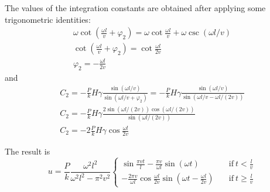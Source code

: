 \begin{Answer}[ref={moving_load}]
The values of the integration constants are obtained after applying some trigonometric identities:
\begin{gather*}
\omega\cot\left(\frac{\omega l}{v}+\varphi_2\right) = \omega\cot\frac{\omega l}{v} + \omega\csc(\omega l/v) \\
\cot\left(\frac{\omega l}{v}+\varphi_2\right) = \cot\frac{\omega l}{2v} \\
\varphi_2 = -\frac{\omega l}{2v}
\end{gather*}
and
\begin{gather*}
C_2 = -\frac{P}{k}H\gamma\frac{\sin(\omega l/v)}{\sin(\omega l/v + \varphi_2)} =
    -\frac{P}{k}H\gamma\frac{\sin(\omega l/v)}{\sin(\omega l/v - \omega l/(2v))} \\[4pt]
C_2 = -\frac{P}{k}H\gamma\frac{2\sin(\omega l/(2v))\cos(\omega l/(2v))}{\sin(\omega l/(2v))} \\[2pt]
C_2 = -2\frac{P}{k}H\gamma\cos\frac{\omega l}{2v}
\end{gather*}

The result is
$$
u = \frac{P}{k}\frac{\omega^2l^2}{\omega^2l^2-\pi^2v^2}
\begin{cases}
\sin\frac{\pi vt}{l} - \frac{\pi v}{\omega l}\sin(\omega t) \quad &\text{if}\ t < \frac{l}{v} \\
-\frac{2\pi v}{\omega l}\cos\frac{\omega l}{2v}\sin(\omega t - \frac{\omega l}{2v}) \quad &\text{if}\ t \geq \frac{l}{v}
\end{cases}
$$

\end{Answer}
